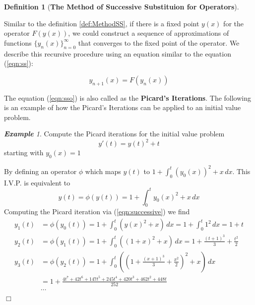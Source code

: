 \documentclass{article}
\theoremstyle{definition}
\newtheorem{definition}{Definition}[section]
\theoremstyle{remark}
\theoremstyle{example}
\newtheorem{example}{\textbf{Example}}[section]
\newcommand{\qedwhite}{\hfill \ensuremath{\Box}}
\begin{document}
\begin{definition}[\textbf{The Method of Successive Substituion for Operators}]\label{def:methodSSO}

Similar to the definition \ref{def:MethodSS}, if there is a fixed point $y(x)$ for the operator $F(y(x))$, we could construct a sequence of approximations of functions $\{y_n(x)\}_{n=0}^{\infty}$ that converges to the fixed point of the operator. We describe this recursive procedure using an equation similar to the equation (\ref{eqn:ss}):

\begin{equation}\label{eqn:sso}
    y_{n+1}(x) = F(y_n(x))
\end{equation}

The equation (\ref{eqn:sso}) is also called as the \textbf{Picard's Iterations}. The following is an example of how the Picard's Iterations can be applied to an initial value problem.

\begin{example}\label{exm:Picard}
    Compute the Picard iterations for the initial value problem
    \begin{equation}
        y'(t) = y(t)^2 + t
    \end{equation}
    starting with $y_0(x) = 1$
\end{example}
    By defining an operator $\phi$ which maps $y(t)$ to $1 + \int_{0}^{t}{(y_0(x))^2 + x \,dx}$. This I.V.P. is equivalent to 
    \begin{equation}
        y(t) = \phi(y(t)) = 1 + \int_{0}^{t}{y_0(x)^2 + x\,dx}
    \end{equation}
    Computing the Picard iteration via (\ref{eqn:successive}) we find
    \begin{align}
        y_1(t) &= \phi(y_0(t)) = 1 + \int_{0}^{t}{(y(x)^2+x)\,dx} = 1 + \int_{0}^{t}{1^2\,dx} = 1 + t\\
        y_2(t) &= \phi(y_1(t)) = 1 + \int_{0}^{t}{((1+x)^2+x)\,dx} = 1 + \frac{(t+1)^3}{3} + \frac{t^2}{2}\\
        y_3(t) &= \phi(y_2(t)) = 1 + \int_{0}^{t}{((1 + \frac{(x+1)^3}{3} + \frac{x^2}{2})^2+x)\,dx}\\
        &= 1+\frac{4t^7+42t^6+147t^5+245t^4+420t^3+462t^2+448t}{252}\\
        &\cdots 
    \end{align}
\qedwhite
\end{definition}

\paragraph{  }
\end{document}
